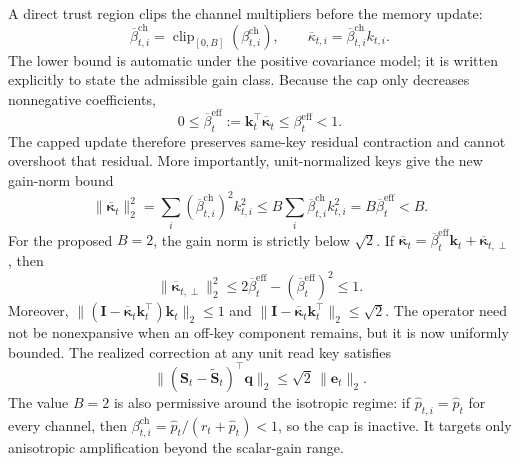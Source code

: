 \documentclass[11pt]{article}
\newcommand{\vct}[1]{\boldsymbol{#1}}
\begin{document}
A direct trust region clips the channel multipliers before the memory update:
\begin{equation}
  \overline\beta_{t,i}^{\mathrm{ch}}
  =\operatorname{clip}_{[0,B]}\!\left(\beta_{t,i}^{\mathrm{ch}}\right),
  \qquad
  \overline\kappa_{t,i}
  =\overline\beta_{t,i}^{\mathrm{ch}}k_{t,i}.
  \label{eq:discussion-channel-gain-cap}
\end{equation}
The lower bound is automatic under the positive covariance model; it is written explicitly to
state the admissible gain class. Because the cap only decreases nonnegative coefficients,
\begin{equation}
  0\leq\overline\beta_t^{\mathrm{eff}}
  :=\vct{k}_t^\top\overline{\vct{\kappa}}_t
  \leq\beta_t^{\mathrm{eff}}<1.
  \label{eq:discussion-capped-effective-write}
\end{equation}
The capped update therefore preserves same-key residual contraction and cannot overshoot that
residual. More importantly, unit-normalized keys give the new gain-norm bound
\begin{equation}
  \|\overline{\vct{\kappa}}_t\|_2^2
  =\sum_i(\overline\beta_{t,i}^{\mathrm{ch}})^2k_{t,i}^2
  \leq B\sum_i\overline\beta_{t,i}^{\mathrm{ch}}k_{t,i}^2
  =B\overline\beta_t^{\mathrm{eff}}<B.
  \label{eq:discussion-capped-gain-norm}
\end{equation}
For the proposed $B=2$, the gain norm is strictly below $\sqrt{2}$. If
$\overline{\vct{\kappa}}_t
=\overline\beta_t^{\mathrm{eff}}\vct{k}_t
+\overline{\vct{\kappa}}_{t,\perp}$, then
\begin{equation}
  \|\overline{\vct{\kappa}}_{t,\perp}\|_2^2
  \leq2\overline\beta_t^{\mathrm{eff}}
       -(\overline\beta_t^{\mathrm{eff}})^2
  \leq1.
  \label{eq:discussion-capped-off-key-gain}
\end{equation}
Moreover,
$\|(\vct{I}-\overline{\vct{\kappa}}_t\vct{k}_t^\top)\vct{k}_t\|_2\leq1$
and
$\|\vct{I}-\overline{\vct{\kappa}}_t\vct{k}_t^\top\|_2\leq\sqrt{2}$.
The operator need not be nonexpansive when an off-key component remains, but it is now uniformly
bounded. The realized correction at any unit read key satisfies
\begin{equation}
  \|(\vct{S}_t-\widetilde{\vct{S}}_t)^\top\vct{q}\|_2
  \leq\sqrt{2}\,\|\vct{e}_t\|_2.
  \label{eq:discussion-capped-cross-key-write}
\end{equation}
The value $B=2$ is also permissive around the isotropic regime: if
$\widehat p_{t,i}=\widehat p_t$ for every channel, then
$\beta_{t,i}^{\mathrm{ch}}=\widehat p_t/(r_t+\widehat p_t)<1$, so the cap is inactive. It targets
only anisotropic amplification beyond the scalar-gain range.
\end{document}
